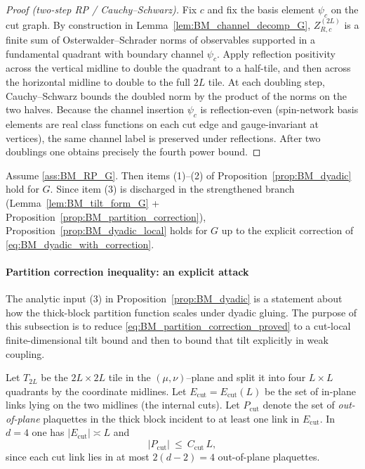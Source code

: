\begin{proof}[Proof (two-step RP / Cauchy--Schwarz)]
Fix $c$ and fix the basis element $\psi_c$ on the cut graph. By construction in Lemma~\ref{lem:BM_channel_decomp_G},
$Z^{(2L)}_{R,c}$ is a finite sum of Osterwalder--Schrader norms of observables supported in a fundamental quadrant with boundary channel $\psi_c$.
Apply reflection positivity across the vertical midline to double the quadrant to a half-tile, and then across the horizontal midline to double
to the full $2L$ tile. At each doubling step, Cauchy--Schwarz bounds the doubled norm by the product of the norms on the two halves.
Because the channel insertion $\psi_c$ is reflection-even (spin-network basis elements are real class functions on each cut edge and gauge-invariant at vertices),
the same channel label is preserved under reflections.
After two doublings one obtains precisely the fourth power bound.
\end{proof}

\begin{corollary}\label{cor:BM_dyadic_G_closed}
Assume \ref{ass:BM_RP_G}. Then items (1)--(2) of Proposition~\ref{prop:BM_dyadic} hold for $G$.
Since item (3) is discharged in the strengthened branch (Lemma~\ref{lem:BM_tilt_form_G} + Proposition~\ref{prop:BM_partition_correction}),
Proposition~\ref{prop:BM_dyadic_local} holds for $G$ up to the explicit correction of \eqref{eq:BM_dyadic_with_correction}.
\end{corollary}







\paragraph{Partition correction inequality: an explicit attack}\label{sec:BM_partition_correction}

The analytic input (3) in Proposition~\ref{prop:BM_dyadic} is a statement about how the thick-block partition function scales under dyadic
gluing. The purpose of this subsection is to reduce \eqref{eq:BM_partition_correction_proved} to a cut-local finite-dimensional tilt bound and then
to bound that tilt explicitly in weak coupling.

\begin{definition}\label{def:BM_cut_set}
Let $T_{2L}$ be the $2L\times 2L$ tile in the $(\mu,\nu)$--plane and split it into four $L\times L$ quadrants by the coordinate midlines.
Let $E_{\mathrm{cut}}=E_{\mathrm{cut}}(L)$ be the set of in-plane links lying on the two midlines (the internal cuts).
Let $P_{\mathrm{cut}}$ denote the set of \emph{out-of-plane} plaquettes in the thick block incident to at least one link in $E_{\mathrm{cut}}$.
In $d=4$ one has $|E_{\mathrm{cut}}|\asymp L$ and
\begin{equation}\label{eq:BM_Pcut_count}
|P_{\mathrm{cut}}|\ \le\ C_{\mathrm{cut}}\,L,
\end{equation}
since each cut link lies in at most $2(d-2)=4$ out-of-plane plaquettes.
\end{definition}

